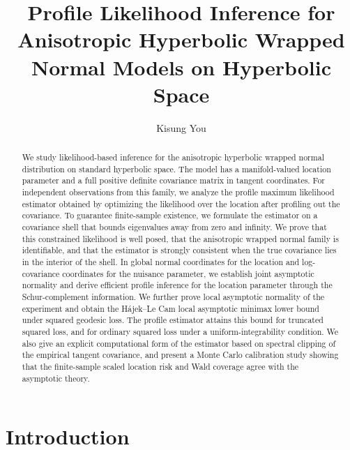 \documentclass[11pt]{article}
\newcommand{\HajekLecam}{H\'ajek--Le Cam\xspace}
\begin{document}
	
\title{Profile Likelihood Inference for Anisotropic Hyperbolic Wrapped Normal Models on Hyperbolic Space}
\author[1,2]{Kisung You}
\date{}

\maketitle
\begin{abstract}
We study likelihood-based inference for the anisotropic hyperbolic wrapped normal distribution on standard hyperbolic space. The model has a manifold-valued location parameter and a full positive definite covariance matrix in tangent coordinates. For independent observations from this family, we analyze the profile maximum likelihood estimator obtained by optimizing the likelihood over the location after profiling out the covariance. To guarantee finite-sample existence, we formulate the estimator on a covariance shell that bounds eigenvalues away from zero and infinity. We prove that this constrained likelihood is well posed, that the anisotropic wrapped normal family is identifiable, and that the estimator is strongly consistent when the true covariance lies in the interior of the shell. In global normal coordinates for the location and log-covariance coordinates for the nuisance parameter, we establish joint asymptotic normality and derive efficient profile inference for the location parameter through the Schur-complement information. We further prove local asymptotic normality of the experiment and obtain the \HajekLecam local asymptotic minimax lower bound under squared geodesic loss. The profile estimator attains this bound for truncated squared loss, and for ordinary squared loss under a uniform-integrability condition. We also give an explicit computational form of the estimator based on spectral clipping of the empirical tangent covariance, and present a Monte Carlo calibration study showing that the finite-sample scaled location risk and Wald coverage agree with the asymptotic theory.
\end{abstract}




\section{Introduction}
\end{document}
